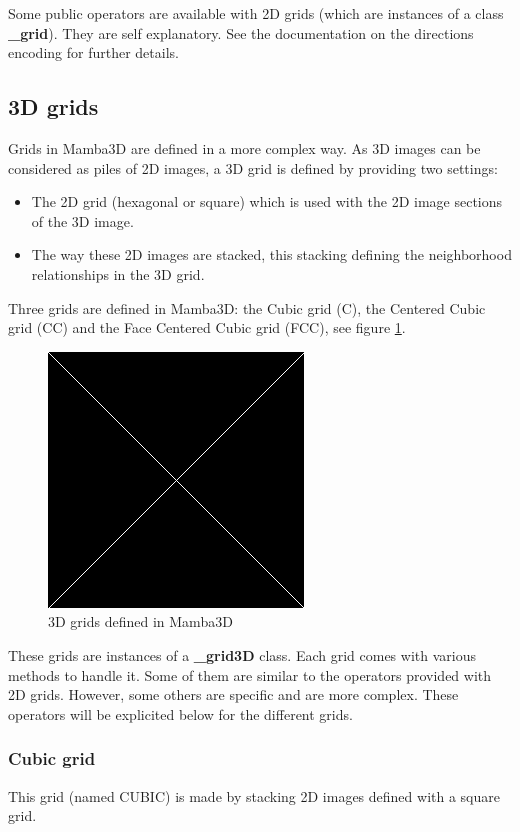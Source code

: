 \documentclass[a4paper,10pt,oneside]{article}
\begin{document}
Some public operators are available with 2D grids (which are instances of a class \textbf{\_grid}). They are self
explanatory. See the documentation on the directions encoding for further details.

\subsection{3D grids}
Grids in Mamba3D are defined in a more complex way. As 3D images can be considered as piles of 2D images,
a 3D grid is defined by providing two settings:

\begin{itemize}
\item The 2D grid (hexagonal or square) which is used with the 2D image sections of the 3D image.
\item The way these 2D images are stacked, this stacking defining the neighborhood relationships in the 3D grid.
\end{itemize}

Three grids are defined in Mamba3D: the Cubic grid (C), the Centered Cubic grid (CC) and the Face Centered Cubic grid (FCC),
see figure \ref{fig:3D_grids}.

\begin{figure}
\centering
\includegraphics[scale=0.3]{figures/xxx.png}
\caption{3D grids defined in Mamba3D}
\label{fig:3D_grids}
\end{figure}

These grids are instances of a \textbf{\_grid3D} class. Each grid comes with various methods to handle it. Some of them are similar to
the operators provided with 2D grids. However, some others are specific and are more complex. These operators will be explicited
below for the different grids.

\subsubsection{Cubic grid}
This grid (named CUBIC) is made by stacking 2D images defined with a square grid.
\end{document}
